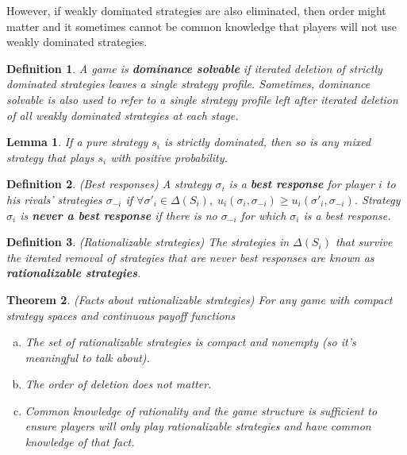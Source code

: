 \documentclass[letter, 10pt]{article}
\newtheorem{definition}{Definition}[section]
\newtheorem{theorem}{Theorem}[section]
\newtheorem{lemma}[theorem]{Lemma}
\begin{document}
\begin{spacing}{1.1}
However, if weakly dominated strategies are also eliminated, then
order might matter and it sometimes cannot be common knowledge that players
will not use weakly dominated strategies.

\begin{definition}
  A game is \textbf{dominance solvable} if iterated deletion of strictly
  dominated strategies leaves a single strategy profile. Sometimes,
  dominance solvable is also used to refer to a single strategy profile
  left after iterated deletion of all weakly dominated strategies at each
  stage.
\end{definition}

\begin{lemma}
  If a pure strategy $s_i$ is strictly dominated, then so is any mixed
  strategy that plays $s_i$ with positive probability.
\end{lemma}

\begin{definition}
  (Best responses) A strategy $\sigma_i$ is a \textbf{best response} for
  player $i$ to his rivals' strategies $\sigma_{-i}$ if $\forall \sigma'_i
  \in \Delta(S_i),\; u_i(\sigma_i, \sigma_{-i}) \geq u_i(\sigma'_i,
  \sigma_{-i})$. Strategy $\sigma_i$ is \textbf{never a best response} if
  there is no $\sigma_{-i}$ for which $\sigma_i$ is a best response.
\end{definition}

\begin{definition}
  (Rationalizable strategies) The strategies in $\Delta(S_i)$ that survive
  the iterated removal of strategies that are never best responses are
  known as \textbf{rationalizable strategies}.
\end{definition}

\begin{theorem}
  (Facts about rationalizable strategies) For any game with compact
  strategy spaces and continuous payoff functions
  \begin{enumerate}[a)]
  \item The set of rationalizable strategies is compact and
    nonempty (so it's meaningful to talk about).
  \item The order of deletion does not matter.
  \item Common knowledge of rationality and the game structure is
    sufficient to ensure players will only play rationalizable strategies
    and have common knowledge of that fact.
  \end{enumerate}
\end{theorem}


\end{spacing}
\end{document}
